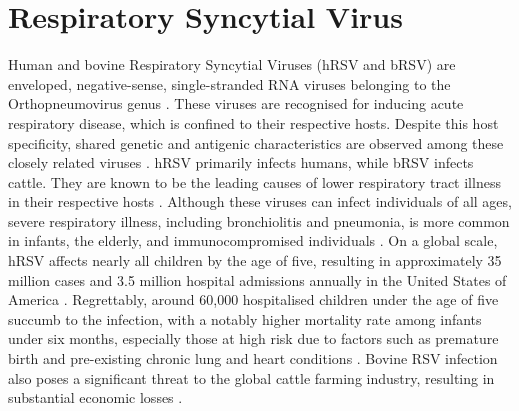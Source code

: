 \section{Respiratory Syncytial Virus} \label{sec:Respiratory Syncytial Virus}
Human and bovine Respiratory Syncytial Viruses (hRSV and bRSV) are enveloped, negative-sense, single-stranded RNA viruses belonging to the Orthopneumovirus genus \cite{Afonso2016Taxonomy2016}. These viruses are recognised for inducing acute respiratory disease, which is confined to their respective hosts. Despite this host specificity, shared genetic and antigenic characteristics are observed among these closely related viruses \cite{Buchholz2000ChimericVaccine}. hRSV primarily infects humans, while bRSV infects cattle. They are known to be the leading causes of lower respiratory tract illness in their respective hosts \cite{Nair2013GlobalAnalysis, Sacco2014RespiratoryCattle}. Although these viruses can infect individuals of all ages, severe respiratory illness, including bronchiolitis and pneumonia, is more common in infants, the elderly, and immunocompromised individuals \cite{Falsey2005RespiratoryAdults, Coultas2019RespiratoryAge}. On a global scale, hRSV affects nearly all children by the age of five, resulting in approximately 35 million cases and 3.5 million hospital admissions annually in the United States of America \cite{Shi2017GlobalStudy}. Regrettably, around 60,000 hospitalised children under the age of five succumb to the infection, with a notably higher mortality rate among infants under six months, especially those at high risk due to factors such as premature birth and pre-existing chronic lung and heart conditions \cite{Shi2017GlobalStudy, Jha2016RespiratoryVirus, Coultas2019RespiratoryAge}. Bovine RSV infection also poses a significant threat to the global cattle farming industry, resulting in substantial economic losses \cite{Brodersen2010BovineVirus, Valarcher2007BovineInfection}.

